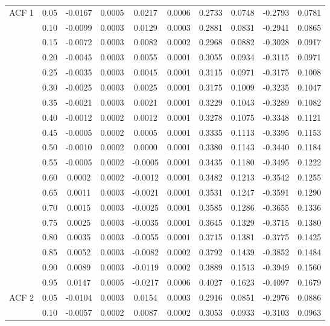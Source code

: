 \begin{table}[H]
\begin{tabular}{cccccccccc}
   \hline
ACF 1 & 0.05 & -0.0167 & 0.0005 & 0.0217 & 0.0006 & 0.2733 & 0.0748 & -0.2793 & 0.0781 \\ 
   & 0.10 & -0.0099 & 0.0003 & 0.0129 & 0.0003 & 0.2881 & 0.0831 & -0.2941 & 0.0865 \\ 
   & 0.15 & -0.0072 & 0.0003 & 0.0082 & 0.0002 & 0.2968 & 0.0882 & -0.3028 & 0.0917 \\ 
   & 0.20 & -0.0045 & 0.0003 & 0.0055 & 0.0001 & 0.3055 & 0.0934 & -0.3115 & 0.0971 \\ 
   & 0.25 & -0.0035 & 0.0003 & 0.0045 & 0.0001 & 0.3115 & 0.0971 & -0.3175 & 0.1008 \\ 
   & 0.30 & -0.0025 & 0.0003 & 0.0025 & 0.0001 & 0.3175 & 0.1009 & -0.3235 & 0.1047 \\ 
   & 0.35 & -0.0021 & 0.0003 & 0.0021 & 0.0001 & 0.3229 & 0.1043 & -0.3289 & 0.1082 \\ 
   & 0.40 & -0.0012 & 0.0002 & 0.0012 & 0.0001 & 0.3278 & 0.1075 & -0.3348 & 0.1121 \\ 
   & 0.45 & -0.0005 & 0.0002 & 0.0005 & 0.0001 & 0.3335 & 0.1113 & -0.3395 & 0.1153 \\ 
   & 0.50 & -0.0010 & 0.0002 & 0.0000 & 0.0001 & 0.3380 & 0.1143 & -0.3440 & 0.1184 \\ 
   & 0.55 & -0.0005 & 0.0002 & -0.0005 & 0.0001 & 0.3435 & 0.1180 & -0.3495 & 0.1222 \\ 
   & 0.60 & 0.0002 & 0.0002 & -0.0012 & 0.0001 & 0.3482 & 0.1213 & -0.3542 & 0.1255 \\ 
   & 0.65 & 0.0011 & 0.0003 & -0.0021 & 0.0001 & 0.3531 & 0.1247 & -0.3591 & 0.1290 \\ 
   & 0.70 & 0.0015 & 0.0003 & -0.0025 & 0.0001 & 0.3585 & 0.1286 & -0.3655 & 0.1336 \\ 
   & 0.75 & 0.0025 & 0.0003 & -0.0035 & 0.0001 & 0.3645 & 0.1329 & -0.3715 & 0.1380 \\ 
   & 0.80 & 0.0035 & 0.0003 & -0.0055 & 0.0001 & 0.3715 & 0.1381 & -0.3775 & 0.1425 \\ 
   & 0.85 & 0.0052 & 0.0003 & -0.0082 & 0.0002 & 0.3792 & 0.1439 & -0.3852 & 0.1484 \\ 
   & 0.90 & 0.0089 & 0.0003 & -0.0119 & 0.0002 & 0.3889 & 0.1513 & -0.3949 & 0.1560 \\ 
   & 0.95 & 0.0147 & 0.0005 & -0.0217 & 0.0006 & 0.4027 & 0.1623 & -0.4097 & 0.1679 \\ 
  ACF 2 & 0.05 & -0.0104 & 0.0003 & 0.0154 & 0.0003 & 0.2916 & 0.0851 & -0.2976 & 0.0886 \\ 
   & 0.10 & -0.0057 & 0.0002 & 0.0087 & 0.0002 & 0.3053 & 0.0933 & -0.3103 & 0.0963 \\ 

\end{tabular}
\end{table}
